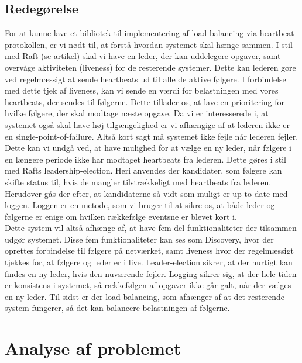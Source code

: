 \documentclass[a4paper,12pt]{article}
\begin{document}
\subsection*{Redegørelse}
For at kunne lave et bibliotek til implementering af load-balancing via heartbeat protokollen, er vi nødt til, at forstå hvordan systemet skal hænge sammen.
I stil med Raft (se artikel) skal vi have en leder, der kan uddelegere opgaver, samt overvåge aktiviteten (liveness) for de resterende systemer. Dette kan lederen gøre ved regelmæssigt at sende heartbeats ud til alle de aktive følgere. I forbindelse med dette tjek af liveness, kan vi sende en værdi for belastningen med vores heartbeats, der sendes til følgerne. Dette tillader os, at lave en prioritering for hvilke følgere, der skal modtage næste opgave. 
Da vi er interesserede i, at systemet også skal have høj tilgængelighed er vi afhængige af at lederen ikke er en single-point-of-failure. Altså kort sagt må systemet ikke fejle når lederen fejler.
\\[5px]
Dette kan vi undgå ved, at have mulighed for at vælge en ny leder, når følgere i en længere periode ikke har modtaget heartbeats fra lederen. Dette gøres i stil med Rafts leadership-election. Heri anvendes der kandidater, som følgere kan skifte status til, hvis de mangler tilstrækkeligt med heartbeats fra lederen. Herudover gås der efter, at kandidaterne så vidt som muligt er up-to-date med loggen. Loggen er en metode, som vi bruger til at sikre os, at både leder og følgerne er enige om hvilken rækkefølge eventsne er blevet kørt i.
\\[5px]
Dette system vil altså afhænge af, at have fem del-funktionaliteter der tilsammen udgør systemet. Disse fem funktionaliteter kan ses som Discovery, hvor der oprettes forbindelse til følgere på netværket, samt liveness hvor der regelmæssigt tjekkes for, at følgere og leder er i live. Leader-election sikrer, at der hurtigt kan findes en ny leder, hvis den nuværende fejler. Logging sikrer sig, at der hele tiden er konsistens i systemet, så rækkefølgen af opgaver ikke går galt, når der vælges en ny leder. Til sidst er der load-balancing, som afhænger af at det resterende system fungerer, så det kan balancere belastningen af følgerne.

\section*{Analyse af problemet}
\end{document}
